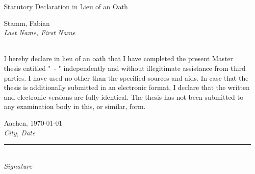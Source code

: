 \documentclass[a4paper,11pt]{MScThesis}
\begin{document}
%
\frontmatter %
%
    \maketitle
%
Statutory Declaration in Lieu of an Oath

\vspace*{0.1\textheight}

\noindent\begin{minipage}[t]{0.5\textwidth}
\begin{flushleft} \large

Stamm, Fabian \\
\emph{\footnotesize Last Name, First Name}

\end{flushleft}
\end{minipage}%
\begin{minipage}[t]{0.5\textwidth}
\begin{flushright} \large


\end{flushright}
\end{minipage}\\[1cm]

\noindent I hereby declare in lieu of an oath that I have completed the present Master thesis entitled "\msctitle\ - \mscsubtitle" independently and without illegitimate assistance from third parties. I have used no other than the specified sources and aids. In case that the thesis is additionally submitted in an electronic format, I declare that the written and electronic versions are fully identical. The thesis has not been submitted to any examination body in this, or similar, form.\\[2cm]


\noindent\begin{minipage}[t]{0.5\textwidth}
\begin{flushleft} \large

Aachen, \today \\
\emph{\footnotesize City, Date}

\end{flushleft}
\end{minipage}%
\begin{minipage}[t]{0.5\textwidth}
\begin{flushright} \large

\break
\rule{10em}{0.5pt}\\ %
\emph{\footnotesize Signature}

\end{flushright}
\end{minipage}\\[3cm]
\end{document}

